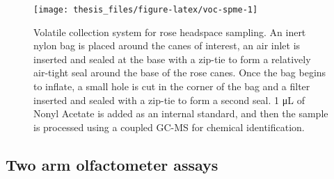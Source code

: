 \documentclass[12pt,final,CPage]{ufthesis}
\begin{document}
{\begin{figure}
  {\centering \texttt{[image: thesis\_files/figure-latex/voc-spme-1]} 

  }

  \caption{Volatile collection system for rose headspace sampling. An inert nylon bag is placed around the canes of interest, an air inlet is inserted and sealed at the base with a zip-tie to form a relatively air-tight seal around the base of the rose canes. Once the bag begins to inflate, a small hole is cut in the corner of the bag and a filter inserted and sealed with a zip-tie to form a second seal. 1 \si{\micro\liter} of Nonyl Acetate is added as an internal standard, and then the sample is processed using a coupled GC-MS for chemical identification.}\label{fig:voc-spme}
  \end{figure}
  \hypertarget{mm-olfact}{%
  \subsection{Two arm olfactometer assays}\label{mm-olfact}}

}
\end{document}
